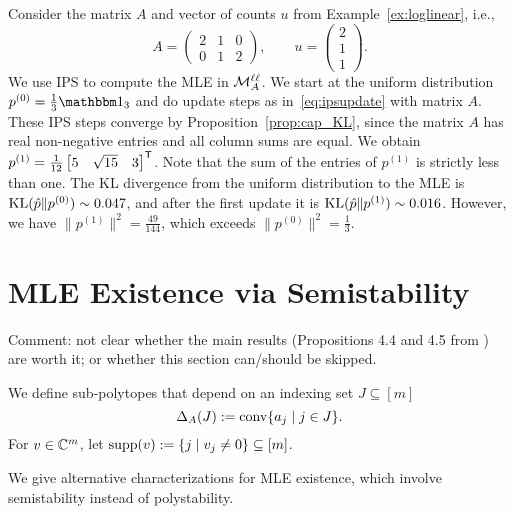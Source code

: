 \begin{example}
	Consider the matrix $A$ and vector of counts $u$ from Example~\ref{ex:loglinear}, i.e.,
		\[ A = \begin{pmatrix} 2 & 1 & 0 \\ 0 & 1 & 2 \end{pmatrix} , \qquad 
		u = \begin{pmatrix} 2 \\ 1 \\ 1 \end{pmatrix} . \]
	We use IPS to compute the MLE in $\mathcal{M}^{\mathtt{\ell \ell}}_A$.
	We start at the uniform distribution $p^{(0)} = \frac13 \ones_3$ and do update steps as in~\eqref{eq:ipsupdate} with matrix $A$. These IPS steps converge by Proposition~\ref{prop:cap_KL}, since the matrix $A$ has real non-negative entries and all column sums are equal. 
	We obtain 
	$ p^{(1)} = \frac{1}{12} \begin{bmatrix} 5 & \sqrt{15} & 3 \end{bmatrix}^{\mathsf{T}} $. Note that the sum of the entries of $p^{(1)}$ is strictly less than one.
	The KL divergence from the uniform distribution to the MLE is $\operatorname{KL}(\hat{p} \| p^{(0)}) \sim 0.047$, and after the first update it is $\operatorname{KL}(\hat{p} \| p^{(1)}) \sim 0.016$. 
	However, we have $\| p^{(1)} \|^2 = \frac{49}{144}$, which exceeds $\| p^{(0)} \|^2 = \frac13$.
	\hfill\exSymbol
\end{example}




\section{MLE Existence via Semistability} \label{sec:LogLinearSemistability}


Comment: not clear whether the main results (Propositions 4.4 and 4.5 from \cite{DiscretePaper}) are worth it; or whether this section can/should be skipped.

We define sub-polytopes that depend on an indexing set $J \subseteq [m]$
\[\Delta_A(J) := \operatorname{conv}\{ a_j \mid j \in J \}.\]
For $v \in \mathbb C^m$, let $\operatorname{supp}(v):= \{ j \mid v_j \neq 0\} \subseteq [m]$. 

\bigskip

We give alternative characterizations for MLE existence, which involve semistability instead of polystability. 


